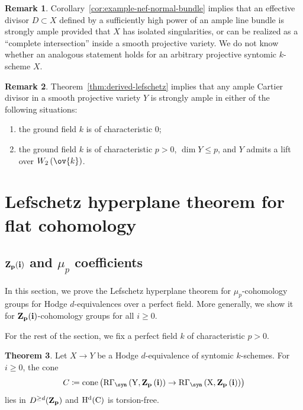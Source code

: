 \documentclass[11pt,reqno]{amsart}
\numberwithin{equation}{section}
\theoremstyle{definition}
\newtheorem{thm}{Theorem}[subsection]
\newtheorem{rmk}[thm]{Remark}
\begin{document}
\begin{rmk}\label{rmk:strongly-ample-examples} Corollary~\ref{cor:example-nef-normal-bundle} implies that an effective divisor $D\subset X$ defined by a sufficiently high power of an ample line bundle is strongly ample provided that $X$ has isolated singularities, or can be realized as a ``complete intersection'' inside a smooth projective variety. We do not know whether an analogous statement holds for an arbitrary projective syntomic $k$-scheme $X$. 
\end{rmk}

\begin{rmk} Theorem~\ref{thm:derived-lefschetz} implies that any ample Cartier divisor in a smooth projective variety $Y$ is strongly ample in either of the following situations:
\begin{enumerate}
    \item the ground field $k$ is of characteristic $0$;
    \item the ground field $k$ is of characteristic $p>0$, $\dim Y\leq p$, and $Y$ admits a lift over $W_2\left(\ov{k}\right)$.
\end{enumerate}
\end{rmk}




\section{Lefschetz hyperplane theorem for flat cohomology}



\subsection{$\bf{Z}_p(i)$ and $\mu_p$ coefficients}\label{section:lefschetz-p-part}

In this section, we prove the Lefschetz hyperplane theorem for $\mu_p$-cohomology groups for Hodge $d$-equivalences over a perfect field. More generally, we show it for $\bf{Z}_p(i)$-cohomology groups for all $i\geq 0$. \smallskip

For the rest of the section, we fix a perfect field $k$ of characteristic $p>0$.

\begin{thm}\label{thm:hodge-implies-twists-lefschetz} Let $X \to Y$ be a Hodge $d$-equivalence of syntomic $k$-schemes. For $i\geq 0$, the cone 
\[
C\coloneqq \rm{cone}\left(\rm{R}\Gamma_\syn\left(Y, \bf{Z}_p\left(i\right)\right) \to \rm{R}\Gamma_\syn\left(X, \bf{Z}_p\left(i\right)\right)\right)
\]
lies in $D^{\geq d}(\bf{Z}_p)$ and $\rm{H}^d(C)$ is torsion-free. 
\end{thm}
\end{document}
